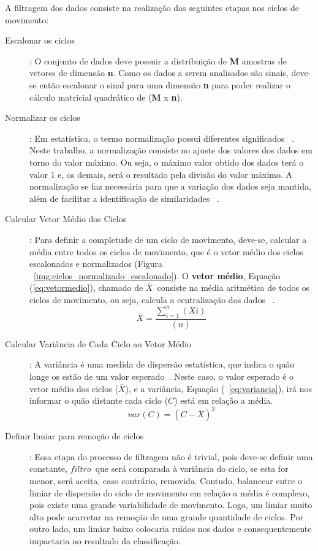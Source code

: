 A filtragem dos dados consiste na realização das seguintes etapas nos ciclos de movimento:
\begin{description}
	\item [Escalonar os ciclos]: O conjunto de dados deve possuir a distribuição de \textbf{M} amostras de vetores de dimensão \textbf{n}. Como os dados a serem analisados são sinais, deve-se então escalonar o sinal para uma dimensão \textbf{n} para poder realizar o cálculo matricial quadrático de (\textbf{M} x \textbf{n}).		
	\item [Normalizar os ciclos]: Em estatística, o termo normalização possui diferentes significados ~\cite{statisticterms2006}. Neste trabalho, a normalização consiste no ajuste dos valores dos dados em torno do valor máximo. Ou seja, o máximo valor obtido dos dados terá o valor 1 e, os demais, será o resultado pela divisão do valor máximo. A normalização se faz necessária para que a variação dos dados seja mantida, além de facilitar a identificação de similaridades ~\cite{vicini2005}. 	
	\item [Calcular Vetor Médio dos Ciclos]: Para definir a completude de um ciclo de movimento, deve-se, calcular a média entre todos os ciclos de movimento, que é o vetor médio dos ciclos escalonados e normalizados (Figura ~\ref{img:ciclos_normalizado_escalonado}). O \textbf{vetor médio}, Equação (\ref{eq:vetormedio}), chamado de $\bar{X}$\, consiste na média aritmética de todos os ciclos de movimento, ou seja, calcula a centralização dos dados ~\cite{statisticshandbook2009}. 	
		\begin{equation}
			\bar{X}=\frac{\sum_{i=1}^{n}(Xi)}{(n)}
			\label{eq:vetormedio}
		\end{equation}
	\item [Calcular Variância de Cada Ciclo ao Vetor Médio]: A variância é uma medida de dispersão estatística, que indica o quão longe os estão de um valor esperado~\cite{statisticshandbook2009}. Neste caso, o valor esperado é o vetor médio dos ciclos ($\bar{X}$), e a variância, Equação (~\ref{eq:variancia}), irá nos informar o quão distante cada ciclo ($C$) está em relação a média.
		\begin{equation}
			var(C) = (C - \bar{X} )^2
			\label{eq:variancia}
		\end{equation}
		
		
	\item [Definir limiar para remoção de ciclos]: Essa etapa do processo de filtragem não é trivial, pois deve-se definir uma constante, $ filtro $\, que será comparada à variância do ciclo, se esta for menor, será aceita, caso contrário, removida. Contudo, balancear entre o limiar de dispersão do ciclo de movimento em relação a média é complexo, pois existe uma grande variabilidade de movimento. Logo, um limiar muito alto pode acarretar na remoção de uma grande quantidade de ciclos. Por outro lado, um limiar baixo colocaria ruídos nos dados e consequentemente impactaria no resultado da classificação.	
	\lstset{language=Matlab}
	\begin{lstlisting}[frame=single, caption=Filtro dos Ciclos]  % Start your code-block
		

\end{lstlisting}
\end{description}
